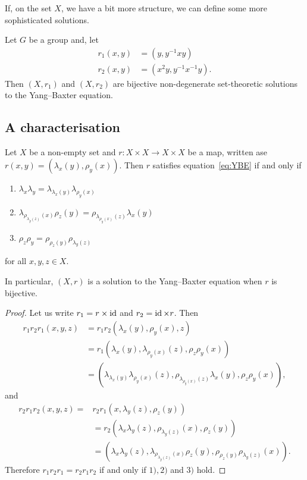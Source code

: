     If, on the set $X$, we have a bit more structure, we can define some more sophisticated solutions.
    \begin{example}
        Let $G$ be a group and, let
        \begin{align*}
            r_1(x,y) &= (y, y^{-1}xy)\\
            r_2(x,y) &= (x^{2}y, y^{-1}x^{-1}y).
        \end{align*}
        Then $(X,r_1)$ and $(X,r_2)$ are bijective non-degenerate set-theoretic solutions to the Yang--Baxter equation.
    \end{example}

    \subsection{A characterisation}
    \begin{proposition}\label{prop:characterisation}
        Let $X$ be a non-empty set and $r: X \times X \to X \times X$ be a  map, written ase $r(x,y) = (\lambda_x(y),\rho_y(x))$. Then $r$ satisfies equation~\ref{eq:YBE} if and only if
    \begin{enumerate}
        \item $\lambda_x\lambda_y = \lambda_{\lambda_x(y)}\lambda_{\rho_y(x)}$
        \item $\lambda_{\rho_{\lambda_y(z)}(x)}\rho_z(y)=\rho_{\lambda_{\rho_y(x)}(z)}\lambda_x(y)$
        \item $\rho_z\rho_y=\rho_{\rho_z(y)}\rho_{\lambda_y(z)}$
    \end{enumerate}
    for all $x,y,z\in X$.

    In particular, $(X,r)$ is a solution to the Yang--Baxter equation when $r$ is bijective.
    \end{proposition}
    \begin{proof}
        Let us write $r_1=r\times \operatorname{id}$ and $r_2=\operatorname{id} \times r$. Then  
        \begin{align*}
            r_1r_2r_1(x,y,z)& = r_1r_2(\lambda_x(y),\rho_y(x),z) \\
            &= r_1(\lambda_x(y),\lambda_{\rho_y(x)}(z),\rho_z\rho_y(x))\\
            &= (\lambda_{\lambda_x(y)}\lambda_{\rho_y(x)}(z),\rho_{\lambda_{\rho_y(x)}(z)}\lambda_x(y),\rho_z\rho_y(x)),
        \end{align*}
        and 
        \begin{align*}
            r_2r_1r_2(x,y,z) =& r_2r_1(x,\lambda_y(z),\rho_z(y)) \\
            &= r_2(\lambda_x\lambda_y(z),\rho_{\lambda_y(z)}(x),\rho_z(y))\\
            &= (\lambda_x\lambda_y(z),\lambda_{\rho_{\lambda_y(z)}(x)}\rho_z(y),\rho_{\rho_z(y)}\rho_{\lambda_y(z)}(x)).
        \end{align*}
        Therefore $r_1r_2r_1= r_2r_1r_2$ if and only if $1), 2)$ and $3)$ hold.     
    \end{proof}


